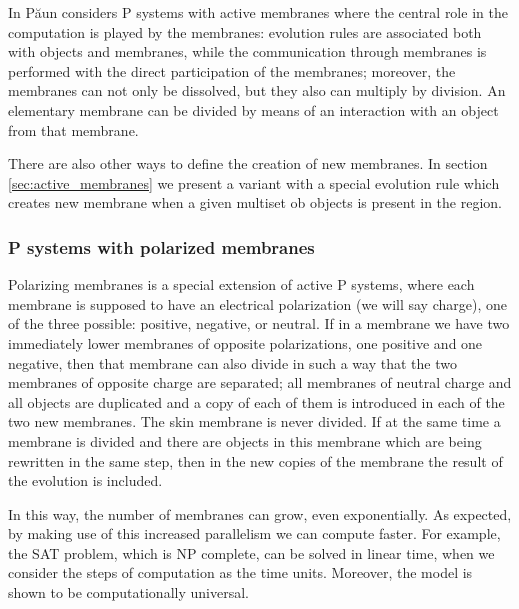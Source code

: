 In \cite{Paun99ActiveMembranes} P\u{a}un considers P systems with active membranes where the central role in the computation is played by the membranes: evolution rules are associated both with objects and membranes, while the communication through membranes is performed with the direct participation of the membranes; moreover, the membranes can not only be dissolved, but they also can multiply by division. An elementary membrane can be divided by means of an interaction with an object from that membrane.

There are also other ways to define the creation of new membranes. In section \ref{sec:active_membranes} we present a variant with a special evolution rule which creates new membrane when a given multiset ob objects is present in the region. 


\subsubsection{P systems with polarized membranes} %
\label{ssub:p_systems_with_polarized_membranes}

Polarizing membranes \cite{Paun99ActiveMembranes} is a special extension of active P systems, where each membrane is supposed to have an electrical polarization (we will say charge), one of the three possible: positive, negative, or neutral. If in a membrane we have two immediately lower membranes of opposite polarizations, one positive and one negative, then that membrane can also divide in such a way that the two membranes of opposite charge are separated; all membranes of neutral charge and all objects are duplicated and a copy of each of them is introduced in each of the two new membranes.
The skin membrane is never divided.
If at the same time a membrane is divided and there are objects in this membrane which are being rewritten in the same step, then in the new copies of the membrane the result of the evolution is included.

In this way, the number of membranes can grow, even exponentially. As expected, by making use of this increased parallelism we can compute faster.
For example, the SAT problem, which is NP complete, can be solved in linear time, when we consider the steps of computation as the time units.
Moreover, the model is shown to be computationally universal.



